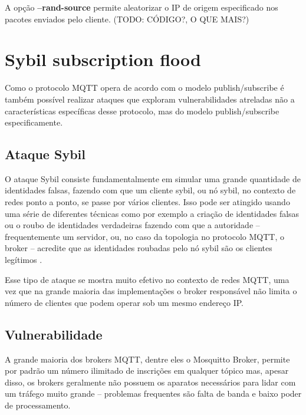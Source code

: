A opção \textbf{--rand-source} permite aleatorizar o IP de origem especificado nos pacotes enviados pelo cliente.
(TODO: CÓDIGO?, O QUE MAIS?)












\section{Sybil subscription flood}

Como o protocolo MQTT opera de acordo com o modelo publish/subscribe é também possível realizar ataques que exploram vulnerabilidades atreladas não a características específicas desse protocolo, mas do modelo publish/subscribe especificamente.




\subsection{Ataque Sybil}

O ataque Sybil consiste fundamentalmente em simular uma grande quantidade de identidades falsas, fazendo com que um cliente sybil, ou nó sybil, no contexto de redes ponto a ponto, se passe por vários clientes. Isso pode ser atingido usando uma série de diferentes técnicas como por exemplo a criação de identidades falsas ou o roubo de identidades verdadeiras fazendo com que a autoridade -- frequentemente um servidor, ou, no caso da topologia no protocolo MQTT, o broker -- acredite que as identidades roubadas pelo nó sybil são os clientes legítimos \cite{Douceur2002}.

Esse tipo de ataque se mostra muito efetivo no contexto de redes MQTT, uma vez que na grande maioria das implementações o broker responsável não limita o número de clientes que podem operar sob um mesmo endereço IP.








\subsection{Vulnerabilidade}

A grande maioria dos brokers MQTT, dentre eles o Mosquitto Broker, permite por padrão um número ilimitado de inscrições em qualquer tópico mas, apesar disso, os brokers geralmente não possuem os aparatos necessários para lidar com um tráfego muito grande -- problemas frequentes são falta de banda e baixo poder de processamento.

